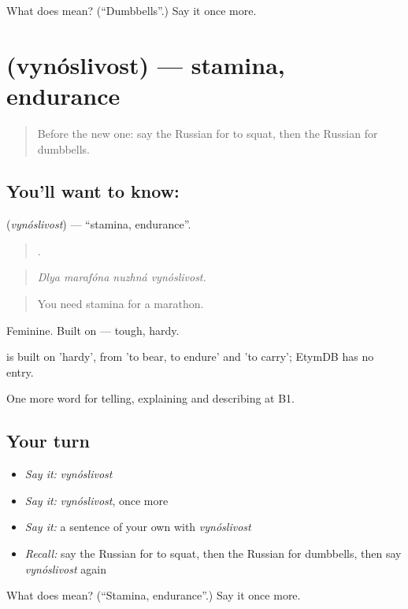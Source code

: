 \begin{tcolorbox}[breakable,colback=teal!4,colframe=teal!35!black,title={Before you move on}]
What does  mean? (\textquotedblleft{}Dumbbells\textquotedblright{}.) Say it once more.
\end{tcolorbox}
\section[\texorpdfstring{\ru{выносливость} (vynóslivost)}{выносливость (vynóslivost)}]{ (vynóslivost) — stamina, endurance}

\label{lesson:RU-C513-vynoslivost}



\begin{quote}
Before the new one: say the Russian for to squat, then the Russian for dumbbells.
\end{quote}

\subsection*{You'll want to know: }
\textbf{} (\emph{vynóslivost}) — \textquotedblleft{}stamina, endurance\textquotedblright{}.

\begin{quote}
   .
\end{quote}

\begin{quote}
\emph{Dlya marafóna nuzhná vynóslivost.}
\end{quote}

\begin{quote}
You need stamina for a marathon.
\end{quote}

Feminine. Built on \emph{} — tough, hardy.

\begin{cousinweb}
\emph{} is built on \emph{} 'hardy', from \emph{} 'to bear, to endure' and \emph{} 'to carry'; EtymDB has no entry.
\end{cousinweb}

\begin{grammarlens}[title={What you've built}]
One more word for telling, explaining and describing at B1.
\end{grammarlens}

\subsection*{Your turn}
\begin{itemize}
\raggedright
  \item \emph{Say it:} \emph{vynóslivost}
  \item \emph{Say it:} \emph{vynóslivost}, once more
  \item \emph{Say it:} a sentence of your own with \emph{vynóslivost}
  \item \emph{Recall:} say the Russian for to squat, then the Russian for dumbbells, then say \emph{vynóslivost} again
\end{itemize}

\begin{tcolorbox}[breakable,colback=teal!4,colframe=teal!35!black,title={Before you move on}]
What does  mean? (\textquotedblleft{}Stamina, endurance\textquotedblright{}.) Say it once more.
\end{tcolorbox}

